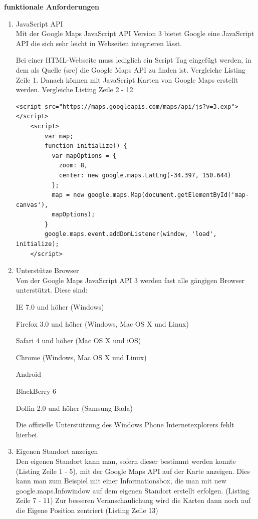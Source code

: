 \textbf{funktionale Anforderungen}
\begin{enumerate}
\item JavaScript API\\
Mit der Google Maps JavaScript API Version 3 bietet Google eine JavaScript API die sich sehr leicht in Webseiten integrieren lässt. 

Bei einer HTML-Webseite muss lediglich ein Script Tag eingefügt werden, in dem als Quelle (src) die Google Maps API zu finden ist. Vergleiche Listing Zeile 1. Danach können mit JavaScript Karten von Google Maps erstellt werden. Vergleiche Listing Zeile 2 - 12.
\begin{lstlisting}
<script src="https://maps.googleapis.com/maps/api/js?v=3.exp"></script>
    <script>
		var map;
		function initialize() {
		  var mapOptions = {
		    zoom: 8,
		    center: new google.maps.LatLng(-34.397, 150.644)
		  };
		  map = new google.maps.Map(document.getElementById('map-canvas'),
	      mapOptions);
		}
		google.maps.event.addDomListener(window, 'load', initialize);
    </script>
\end{lstlisting} \cite[Codebeispiel Simple Map]{googlemaps}


\item Unterstütze Browser\\
Von der Google Maps JavaScript API 3 werden fast alle gängigen Browser unterstützt. Diese sind:

\glqq 
    IE 7.0 und höher (Windows)
    
    Firefox 3.0 und höher (Windows, Mac OS X und Linux)
    
    Safari 4 und höher (Mac OS X und iOS)
    
    Chrome (Windows, Mac OS X und Linux)
    
    Android
    
    BlackBerry 6
    
    Dolfin 2.0 und höher (Samsung Bada)
\grqq \cite{googlemaps}

Die offizielle Unterstützung des Windows Phone Internetexplorers fehlt hierbei.

\item Eigenen Standort anzeigen\\
Den eigenen Standort kann man, sofern dieser bestimmt werden konnte (Listing Zeile 1 - 5), mit der Google Maps API auf der Karte anzeigen. Dies kann man zum Beispiel mit einer Informationsbox, die man mit \glqq new google.maps.Infowindow \grqq auf dem eigenen Standort erstellt erfolgen. (Listing Zeile 7 - 11) Zur besseren Veranschaulichung wird die Karten dann noch auf die Eigene Position zentriert (Listing Zeile 13)


\end{enumerate}
